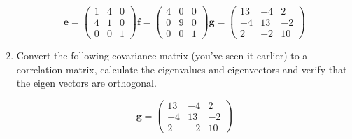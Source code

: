 \begin{enumerate}
\begin{displaymath}
\boldsymbol{e} = \left( \begin{array}{rrr} 1 & 4 & 0\\ 4 & 1 & 0 \\ 0 & 0 & 1 \end{array} \right)
\boldsymbol{f} = \left( \begin{array}{rrr} 4 & 0 & 0 \\ 0  & 9 & 0 \\ 0 & 0 & 1  \end{array} \right)
\boldsymbol{g} = \left( \begin{array}{rrr} 13 & -4 & 2\\ -4 & 13 & -2 \\ 2 & -2 & 10 \end{array} \right)
\end{displaymath}




\item Convert the following covariance matrix (you've seen it earlier) to a correlation matrix, calculate the eigenvalues and eigenvectors and verify that the eigen vectors are orthogonal.

\begin{displaymath}
\boldsymbol{g} = \left( \begin{array}{rrr} 13 & -4 & 2\\ -4 & 13 & -2 \\ 2 & -2 & 10 \end{array} \right)
\end{displaymath}

\end{enumerate}



